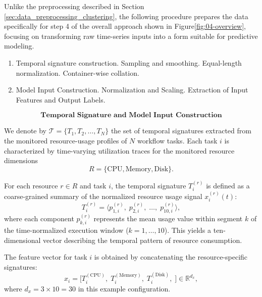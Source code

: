 \label{sec:data_preprocessing_predictive}

Unlike the preprocessing described in Section \ref{sec:data_preprocessing_clustering}, the following procedure prepares the data specifically for step 4 of the overall approach shown in Figure\ref{fig:04-overview}, focusing on transforming raw time-series inputs into a form suitable for predictive modeling.

\begin{enumerate}
    \item Temporal signature construction.
          \subitem Sampling and smoothing.
          \subitem Equal-length normalization.
          \subitem Container-wise collation.
    \item Model Input Construction.
          \subitem Normalization and Scaling.
          \subitem Extraction of Input Features and Output Labels.
\end{enumerate}


\[
    \textbf{Temporal Signature and Model Input Construction}
\]

We denote by \( \mathcal{T} = \{ T_1, T_2, \dots, T_N \} \) the set of
temporal signatures extracted from the monitored resource-usage profiles
of \( N \) workflow tasks.
Each task \( i \) is characterized by time-varying utilization traces
for the monitored resource dimensions
\[
    R = \{ \text{CPU}, \text{Memory}, \text{Disk} \}.
\]

\noindent
For each resource \( r \in R \) and task \( i \),
the temporal signature \( T_i^{(r)} \) is defined as a
coarse-grained summary of the normalized resource usage signal
\( x_i^{(r)}(t) \):
\[
    T_i^{(r)} =
    \bigl\langle
    p_{1,i}^{(r)},\;
    p_{2,i}^{(r)},\;
    \dots,\;
    p_{10,i}^{(r)}
    \bigr\rangle,
    \tag{1}
\]
where each component \( p_{k,i}^{(r)} \) represents the mean
usage value within segment \( k \) of the time-normalized
execution window (\( k = 1, \dots, 10 \)).
This yields a ten-dimensional vector describing the temporal pattern of
resource consumption.

\noindent
The feature vector for task \( i \) is obtained by concatenating
the resource-specific signatures:
\[
    x_i =
    \bigl[
    T_i^{(\text{CPU})},\;
    T_i^{(\text{Memory})},\;
    T_i^{(\text{Disk})},\;
    \bigr]
    \in \mathbb{R}^{d_x},
\]
where \( d_x = 3 \times 10 = 30 \) in this example configuration.

